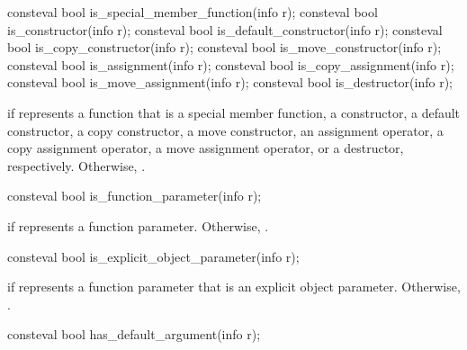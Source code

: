 %
%
%
%
%
%
%
%
%
\begin{itemdecl}
consteval bool is_special_member_function(info r);
consteval bool is_constructor(info r);
consteval bool is_default_constructor(info r);
consteval bool is_copy_constructor(info r);
consteval bool is_move_constructor(info r);
consteval bool is_assignment(info r);
consteval bool is_copy_assignment(info r);
consteval bool is_move_assignment(info r);
consteval bool is_destructor(info r);
\end{itemdecl}

\begin{itemdescr}
\pnum
\returns
{} if  represents a function that is a
special member function,
a constructor,
a default constructor,
a copy constructor,
a move constructor,
an assignment operator,
a copy assignment operator,
a move assignment operator, or
a destructor, respectively.
Otherwise, .
\end{itemdescr}

%
\begin{itemdecl}
consteval bool is_function_parameter(info r);
\end{itemdecl}

\begin{itemdescr}
\pnum
\returns
{} if  represents a function parameter.
Otherwise, .
\end{itemdescr}

%
\begin{itemdecl}
consteval bool is_explicit_object_parameter(info r);
\end{itemdecl}

\begin{itemdescr}
\pnum
\returns
{} if  represents a function parameter
that is an explicit object parameter.
Otherwise, .
\end{itemdescr}

%
\begin{itemdecl}
consteval bool has_default_argument(info r);
\end{itemdecl}

